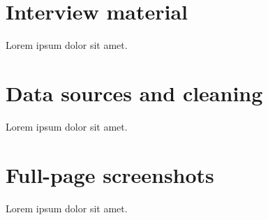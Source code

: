 \documentclass{aureport}
\begin{document}
\printbibliography[title=Bibliography]

\appendix

\section{Interview material}\label{app:interview}
Lorem ipsum dolor sit amet.

\section{Data sources and cleaning}\label{app:data}
Lorem ipsum dolor sit amet.

\section{Full-page screenshots}\label{app:screens}
Lorem ipsum dolor sit amet.
\end{document}
